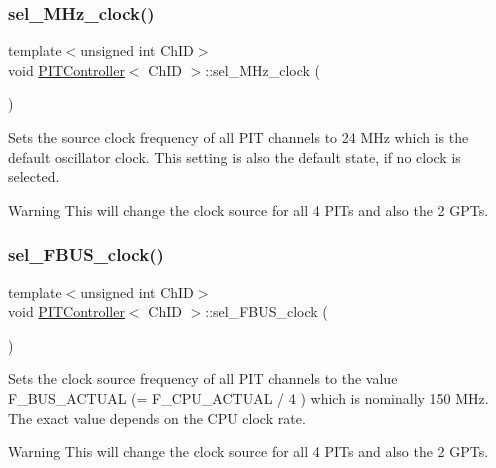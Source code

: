 \subsubsection{\texorpdfstring{sel\+\_\+M\+Hz\+\_\+clock()}{sel\_24MHz\_clock()}}
{\footnotesize\ttfamily template$<$unsigned int Ch\+ID$>$ \\
void \hyperlink{classPITController}{P\+I\+T\+Controller}$<$ Ch\+ID $>$\+::sel\+\_\+M\+Hz\+\_\+clock (\begin{DoxyParamCaption}{ }\end{DoxyParamCaption})\hspace{0.3cm}{\ttfamily [inline]}}



Sets the source clock frequency of all P\+IT channels to 24 M\+Hz which is the default oscillator clock. This setting is also the default state, if no clock is selected. 

\begin{DoxyWarning}{Warning}
This will change the clock source for all 4 P\+I\+Ts and also the 2 G\+P\+Ts. 
\end{DoxyWarning}
\mbox{\label{group__CLK_ga63e67e2ebfd6ceb5f5e38d9bd6a54754}} 
\subsubsection{\texorpdfstring{sel\+\_\+\+F\+B\+U\+S\+\_\+clock()}{sel\_FBUS\_clock()}}
{\footnotesize\ttfamily template$<$unsigned int Ch\+ID$>$ \\
void \hyperlink{classPITController}{P\+I\+T\+Controller}$<$ Ch\+ID $>$\+::sel\+\_\+\+F\+B\+U\+S\+\_\+clock (\begin{DoxyParamCaption}{ }\end{DoxyParamCaption})\hspace{0.3cm}{\ttfamily [inline]}}



Sets the clock source frequency of all P\+IT channels to the value F\+\_\+\+B\+U\+S\+\_\+\+A\+C\+T\+U\+AL (= F\+\_\+\+C\+P\+U\+\_\+\+A\+C\+T\+U\+AL / 4 ) which is nominally 150 M\+Hz. The exact value depends on the C\+PU clock rate. 

\begin{DoxyWarning}{Warning}
This will change the clock source for all 4 P\+I\+Ts and also the 2 G\+P\+Ts. 
\end{DoxyWarning}
